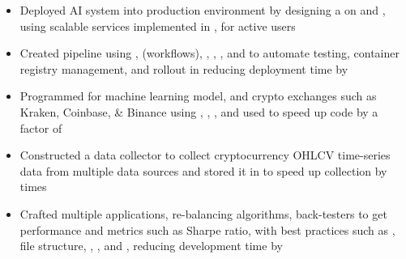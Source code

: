 {\begin{rSection}{}
 \href{https://www.wealthagile.com/}{} \hfill {}
\begin{itemize}
    \itemsep -4pt {} 
    \item Deployed AI system into production environment by designing a  on  and , using scalable services implemented in , for  active users
    \item Created  pipeline using ,  (workflows), , , , and  to automate testing, container registry management, and rollout in  reducing deployment time by 
    \item Programmed  for  machine learning model, and crypto exchanges such as Kraken, Coinbase, \& Binance using , , , and used  to speed up code by a factor of 
    \item Constructed a  data collector to collect cryptocurrency OHLCV time-series data from multiple data sources and stored it in  to speed up collection by  times
    \item Crafted multiple  applications, re-balancing algorithms, back-testers to get performance and metrics such as Sharpe ratio, with best practices such as , file structure, , , and , reducing development time by 
\end{itemize}


\end{rSection}}
